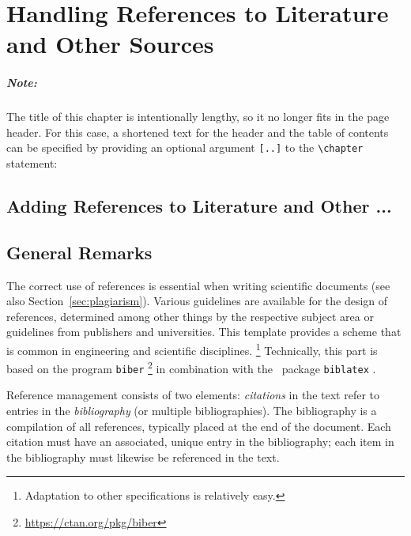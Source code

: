 \chapter[References to Literature]{Handling References to Literature and Other Sources}
\label{cha:Literature}

\paragraph{Note:} The title of this chapter is intentionally lengthy, so it no
longer fits in the page header. For this case, a shortened text for the header
and the table of contents can be specified by providing an
optional argument \verb![..]! to the \verb!\chapter! statement:
%
\begin{LaTeXCode}[numbers=none]
\chapter[References to Literature]{Adding References to Literature and Other ...}
\end{LaTeXCode}


\section{General Remarks}

The correct use of references is essential when writing scientific documents
(see also Section~\ref{sec:plagiarism}). Various guidelines are available for
the design of references, determined among other things by the respective 
subject area or guidelines from publishers and universities. 
This template provides a scheme that is common in engineering and scientific
disciplines.%
\footnote{Adaptation to other specifications is relatively easy.}
Technically, this part is based on the program \texttt{biber}%
\footnote{\url{https://ctan.org/pkg/biber}}
in combination with the \latex\ package \texttt{biblatex} \cite{Kime2026}.

Reference management consists of two elements: \emph{citations} in the text
refer to entries in the \emph{bibliography} (or multiple bibliographies). The
bibliography is a compilation of all references, typically placed at the end of
the document. Each citation must have an associated, unique entry in the
bibliography; each item in the bibliography must likewise be referenced in the
text.


